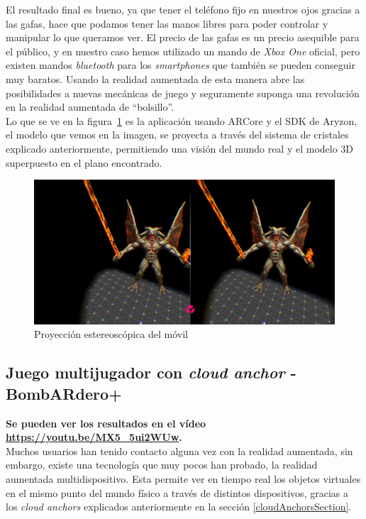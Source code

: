 El resultado final es bueno, ya que tener el teléfono fijo en nuestros ojos gracias a las gafas, hace que podamos tener las manos libres para poder controlar y manipular lo que queramos ver. El precio de las gafas es un precio asequible para el público, y en nuestro caso hemos utilizado un mando de \textit{Xbox One} oficial, pero existen mandos \textit{bluetooth} para los \textit{smartphones} que también se pueden conseguir muy baratos. Usando la realidad aumentada de esta manera abre las posibilidades a nuevas mecánicas de juego y seguramente suponga una revolución en la realidad aumentada de ``bolsillo''.\\

Lo que se ve en la figura~\ref{appAryzon} es la aplicación usando ARCore y el SDK de Aryzon, el modelo que vemos en la imagen, se proyecta a través del sistema de cristales explicado anteriormente, permitiendo una visión del mundo real y el modelo 3D superpuesto en el plano encontrado.

\begin{figure}[H]
    \centering
    \includegraphics[width=0.75\linewidth]{Images/aryzonVisualizer.png}
    \caption{Proyección estereoscópica del móvil}
    \label{appAryzon}
\end{figure}
 \newpage
\subsection{Juego multijugador con \textit{cloud anchor} - BombARdero+}\label{bombARdero}
\textbf{Se pueden ver los resultados en el vídeo \url{https://youtu.be/MX5_5ui2WUw}.}\\
Muchos usuarios han tenido contacto alguna vez con la realidad aumentada, sin embargo, existe una tecnología que muy pocos han probado, la realidad aumentada multidispositivo. Esta permite ver en tiempo real los objetos virtuales en el mismo punto del mundo físico a través de distintos dispositivos, gracias a los \textit{cloud anchors} explicados anteriormente en la sección \ref{cloudAnchorsSection}.\\

